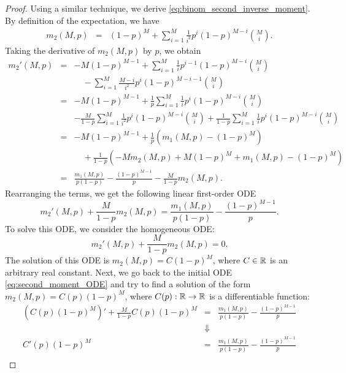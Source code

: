 \begin{proof}
    Using a similar technique, we derive \eqref{eq:binom_second_inverse_moment}. By definition of the expectation, we have
    \begin{eqnarray*}
        m_2(M,p) &=& (1-p)^M + \sum\limits_{i=1}^M \frac{1}{i^2}p^i(1-p)^{M-i}\binom{M}{i}.
    \end{eqnarray*}
    Taking the derivative of $m_2(M,p)$ by $p$, we obtain
    \begin{eqnarray*}
        m_2'(M,p) &=& -M(1-p)^{M-1} + \sum\limits_{i=1}^M\frac{1}{i}p^{i-1}(1-p)^{M-i}\binom{M}{i}\\
        &&\quad - \sum\limits_{i=1}^M\frac{M-i}{i^2}p^i(1-p)^{M-i-1}\binom{M}{i}\\
        &=& -M(1-p)^{M-1} + \frac{1}{p} \sum\limits_{i=1}^M\frac{1}{i}p^{i}(1-p)^{M-i}\binom{M}{i}\\
        && - \frac{M}{1-p}\sum\limits_{i=1}^M\frac{1}{i^2}p^i(1-p)^{M-i}\binom{M}{i} + \frac{1}{1-p}\sum\limits_{i=1}^M\frac{1}{i}p^i(1-p)^{M-i}\binom{M}{i}\\
        &=& -M(1-p)^{M-1} + \frac{1}{p}\left(m_1(M,p) - (1-p)^M\right) \\
        &&\quad + \frac{1}{1-p}\left(-M m_2(M,p) + M(1-p)^M + m_1(M,p) - (1-p)^M\right)\\
        &=& \frac{m_1(M,p)}{p(1-p)} - \frac{(1-p)^{M-1}}{p} - \frac{M}{1-p}m_2(M,p).
    \end{eqnarray*}
    Rearranging the terms, we get the following linear first-order ODE
    \begin{equation}
        m_2'(M,p) + \frac{M}{1-p}m_2(M,p) = \frac{m_1(M,p)}{p(1-p)} - \frac{(1-p)^{M-1}}{p}. \label{eq:second_moment_ODE}
    \end{equation}
    To solve this ODE, we consider the homogeneous ODE:
    \begin{equation*}
        m_2'(M,p) + \frac{M}{1-p}m_2(M,p) = 0.
    \end{equation*}
    The solution of this ODE is $m_2(M,p) = C(1-p)^M$, where $C\in\mathbb{R}$ is an arbitrary real constant. Next, we go back to the initial ODE \eqref{eq:second_moment_ODE} and try to find a solution of the form $m_2(M,p) = C(p)(1-p)^M$, where $C(p):\mathbb{R} \to \mathbb{R}$ is a differentiable function:
    \begin{eqnarray*}
        \left(C(p)(1-p)^M\right)' + \frac{M}{1-p}C(p)(1-p)^M &=& \frac{m_1(M,p)}{p(1-p)} - \frac{(1-p)^{M-1}}{p}\\
        &\Downarrow&\\
        C'(p)(1-p)^M &=& \frac{m_1(M,p)}{p(1-p)} - \frac{(1-p)^{M-1}}{p}\\

\end{eqnarray*}
\end{proof}
